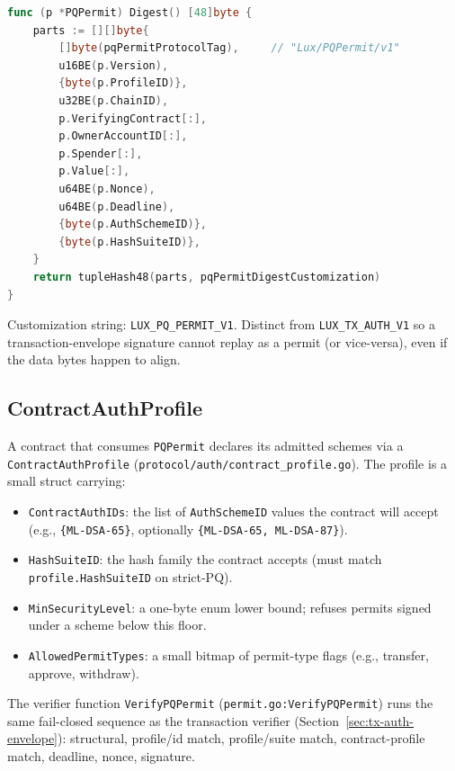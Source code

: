 \begin{lstlisting}[language=Go,caption={\texttt{Digest} for \texttt{PQPermit}.
Source: \texttt{protocol/auth/permit.go:95}.}]
func (p *PQPermit) Digest() [48]byte {
    parts := [][]byte{
        []byte(pqPermitProtocolTag),     // "Lux/PQPermit/v1"
        u16BE(p.Version),
        {byte(p.ProfileID)},
        u32BE(p.ChainID),
        p.VerifyingContract[:],
        p.OwnerAccountID[:],
        p.Spender[:],
        p.Value[:],
        u64BE(p.Nonce),
        u64BE(p.Deadline),
        {byte(p.AuthSchemeID)},
        {byte(p.HashSuiteID)},
    }
    return tupleHash48(parts, pqPermitDigestCustomization)
}
\end{lstlisting}

Customization string: \texttt{LUX\_PQ\_PERMIT\_V1}. Distinct from
\texttt{LUX\_TX\_AUTH\_V1} so a transaction-envelope signature cannot replay
as a permit (or vice-versa), even if the data bytes happen to align.

\subsection{ContractAuthProfile}

A contract that consumes \texttt{PQPermit} declares its admitted schemes via
a \texttt{ContractAuthProfile} (\texttt{protocol/auth/contract\_profile.go}).
The profile is a small struct carrying:

\begin{itemize}[leftmargin=2em,nosep]
  \item \texttt{ContractAuthIDs}: the list of \texttt{AuthSchemeID} values
    the contract will accept (e.g., \texttt{\{ML-DSA-65\}}, optionally
    \texttt{\{ML-DSA-65, ML-DSA-87\}}).
  \item \texttt{HashSuiteID}: the hash family the contract accepts (must
    match \texttt{profile.HashSuiteID} on strict-PQ).
  \item \texttt{MinSecurityLevel}: a one-byte enum lower bound; refuses
    permits signed under a scheme below this floor.
  \item \texttt{AllowedPermitTypes}: a small bitmap of permit-type flags
    (e.g., transfer, approve, withdraw).
\end{itemize}

The verifier function \texttt{VerifyPQPermit} (\texttt{permit.go:VerifyPQPermit})
runs the same fail-closed sequence as the transaction verifier
(Section~\ref{sec:tx-auth-envelope}): structural, profile/id match,
profile/suite match, contract-profile match, deadline, nonce, signature.

